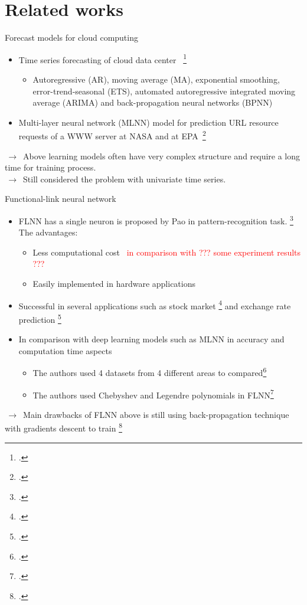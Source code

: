 \documentclass{beamer}
\def \GN#1{\textcolor{red}{~#1}}				%
\begin{document}
\section{Related works}
\begin{frame}{Forecast models for cloud computing}
	\begin{itemize}
			\item{
				Time series forecasting of cloud data center~ \footcite{Hipel et al. 1994}
				}
				\begin{itemize}
					\item {
						Autoregressive (AR), moving average (MA), exponential smoothing, error-trend-seasonal (ETS), automated autoregressive integrated moving average (ARIMA) and back-propagation neural networks (BPNN)  
					}
				\end{itemize}	

			\item {
	 			Multi-layer neural network (MLNN) model for prediction URL resource requests of a WWW server at NASA and at EPA~\footcite{Prevost et al. 2011}  
			}
	\end{itemize}
	\vspace{0.3cm}
		$\,\to\,$ Above learning models often have very complex structure and require a long time for training process.\\
		$\,\to\,$ Still considered the problem with univariate time series.

\end{frame}
\begin{frame}{Functional-link neural network}
	\begin{itemize}
		\item{
			 \small FLNN has a single neuron is proposed by Pao in pattern-recognition task. \footcite{Yoh-Han Pao 1989} The advantages: 
			\begin{itemize}
				\item {
					\small Less computational cost \GN{in comparison with ??? some experiment results ???}
				}
				\item {
					\small Easily implemented in hardware applications
				}
			\end{itemize}
		}
		\item{
			\small  Successful in several applications such as stock market \footcite{Majhi et al. 2009} and exchange rate prediction \footcite{Majhi et al. 2012}
		}
		\item{
			\small  In comparison with deep learning models such as MLNN in accuracy and computation time aspects
			\begin{itemize}
				\item {
					\small The authors used 4 datasets from 4 different areas to compared\footcite{Khandelwal et al. 2015}
				}
				\item {
					\small The authors used Chebyshev and Legendre polynomials in FLNN\footcite{Sahoo et al. 2018}
				}
			\end{itemize}
		}		
	\end{itemize}
	
	$\,\to\,$ Main drawbacks of FLNN above is still using back-propagation technique with gradients descent to train \footcite{Dehuri, Satchidananda, and Sung-Bae Cho 2010}
\end{frame}
\end{document}
